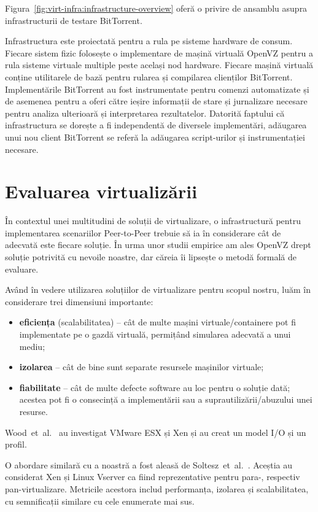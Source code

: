 Figura~\ref{fig:virt-infra:infrastructure-overview} oferă o privire
de ansamblu asupra infrastructurii de testare BitTorrent.

Infrastructura este proiectată pentru a rula pe sisteme hardware de
consum. Fiecare sistem fizic folosește o implementare de mașină virtuală
OpenVZ pentru a rula sisteme virtuale multiple peste același nod hardware.
Fiecare mașină virtuală conține utilitarele de bază pentru rularea și compilarea
clienților BitTorrent. Implementările BitTorrent au fost instrumentate pentru
comenzi automatizate și de asemenea pentru a oferi către ieșire informații
de stare și jurnalizare necesare pentru analiza ulterioară și interpretarea
rezultatelor. Datorită faptului că infrastructura se dorește a fi
independentă de diversele implementări, adăugarea unui nou client BitTorrent
se referă la adăugarea script-urilor și instrumentației necesare.

\section{Evaluarea virtualizării}

În contextul unei multitudini de soluții de virtualizare, o infrastructură
pentru implementarea scenariilor Peer-to-Peer trebuie să ia în considerare
cât de adecvată este fiecare soluție. În urma unor studii empirice am ales
OpenVZ drept soluție potrivită cu nevoile noastre, dar căreia îi lipsește 
o metodă formală de evaluare.

Având în vedere utilizarea soluțiilor de virtualizare pentru scopul nostru,
luăm în considerare trei dimensiuni importante:

\begin{itemize}
  \item \textbf{eficiența} (scalabilitatea) -- cât de multe mașini
  virtuale/containere pot fi implementate pe o gazdă virtuală, permițând
  simularea adecvată a unui mediu;
  \item \textbf{izolarea} -- cât de bine sunt separate resursele mașinilor
  virtuale;
  \item \textbf{fiabilitate} -- cât de multe defecte software au loc pentru
  o soluție dată; acestea pot fi o consecință a implementării sau a
  suprautilizării/abuzului unei resurse.
\end{itemize}

Wood~et~al.~\cite{virt-prof-model} au investigat VMware ESX și Xen și au
creat un model I/O și un profil.

O abordare similară cu a noastră a fost aleasă de 
Soltesz~et~al.~\cite{virt-doppel}. Aceștia au considerat Xen și Linux
Vserver ca fiind reprezentative pentru para-, respectiv pan-virtualizare.
Metricile acestora includ performanța, izolarea și scalabilitatea, cu
semnificații similare cu cele enumerate mai sus.


